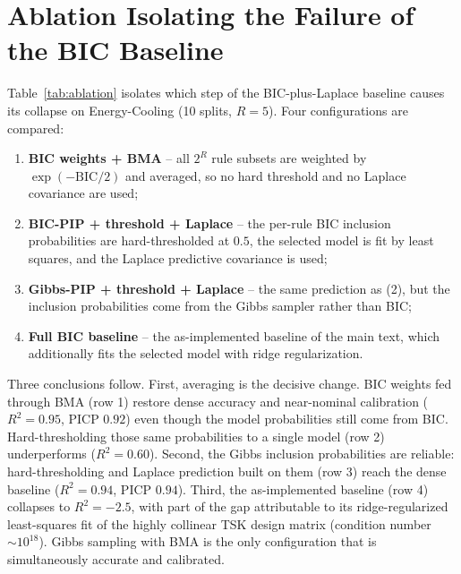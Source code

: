 \documentclass[review,1p,times]{elsarticle}
\begin{document}
\FloatBarrier

\section{Ablation Isolating the Failure of the BIC Baseline}

Table~\ref{tab:ablation} isolates which step of the BIC-plus-Laplace baseline causes its collapse on Energy-Cooling (10 splits, $R=5$). Four configurations are compared:

\begin{enumerate}
\item \textbf{BIC weights + BMA} -- all $2^R$ rule subsets are weighted by $\exp(-\mathrm{BIC}/2)$ and averaged, so no hard threshold and no Laplace covariance are used;
\item \textbf{BIC-PIP + threshold + Laplace} -- the per-rule BIC inclusion probabilities are hard-thresholded at $0.5$, the selected model is fit by least squares, and the Laplace predictive covariance is used;
\item \textbf{Gibbs-PIP + threshold + Laplace} -- the same prediction as (2), but the inclusion probabilities come from the Gibbs sampler rather than BIC;
\item \textbf{Full BIC baseline} -- the as-implemented baseline of the main text, which additionally fits the selected model with ridge regularization.
\end{enumerate}

Three conclusions follow.
First, averaging is the decisive change.
BIC weights fed through BMA (row 1) restore dense accuracy and near-nominal calibration ($R^2=0.95$, PICP $0.92$) even though the model probabilities still come from BIC.
Hard-thresholding those same probabilities to a single model (row 2) underperforms ($R^2=0.60$). Second, the Gibbs inclusion probabilities are reliable: hard-thresholding and Laplace prediction built on them (row 3) reach the dense baseline ($R^2=0.94$, PICP $0.94$). Third, the as-implemented baseline (row 4) collapses to $R^2=-2.5$, with part of the gap attributable to its ridge-regularized least-squares fit of the highly collinear TSK design matrix (condition number $\sim10^{18}$). Gibbs sampling with BMA is the only configuration that is simultaneously accurate and calibrated.
\end{document}
